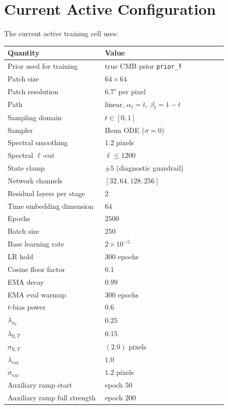\documentclass[11pt]{article}
\begin{document}
\section{Current Active Configuration}

The current active training cell uses:
\begin{center}
\begin{tabular}{>{\raggedright\arraybackslash}p{0.38\linewidth}p{0.48\linewidth}}
\toprule
Quantity & Value \\
\midrule
Prior used for training & true CMB prior \texttt{prior\_f} \\
Patch size & \(64\times 64\) \\
Patch resolution & \(6.7'\) per pixel \\
Path & linear, \(\alpha_t=t,\ \beta_t=1-t\) \\
Sampling domain & \(t\in[0,1]\) \\
Sampler & Heun ODE (\(\sigma=0\)) \\
Spectral smoothing & \(1.2\) pixels \\
Spectral \(\ell\)-cut & \(\ell \le 1200\) \\
State clamp & \(\pm 5\) (diagnostic guardrail) \\
Network channels & \([32,64,128,256]\) \\
Residual layers per stage & \(2\) \\
Time embedding dimension & \(64\) \\
Epochs & \(2500\) \\
Batch size & \(250\) \\
Base learning rate & \(2\times 10^{-5}\) \\
LR hold & \(300\) epochs \\
Cosine floor factor & \(0.1\) \\
EMA decay & \(0.99\) \\
EMA eval warmup & \(300\) epochs \\
\(t\)-bias power & \(0.6\) \\
\(\lambda_{x_0}\) & \(0.25\) \\
\(\lambda_{\mathrm{lf},T}\) & \(0.15\) \\
\(\sigma_{\mathrm{lf},T}\) & \((2.0)\) pixels \\
\(\lambda_{\mathrm{var}}\) & \(1.0\) \\
\(\sigma_{\mathrm{var}}\) & \(1.2\) pixels \\
Auxiliary ramp start & epoch \(50\) \\
Auxiliary ramp full strength & epoch \(200\) \\

\end{tabular}
\end{center}
\end{document}
